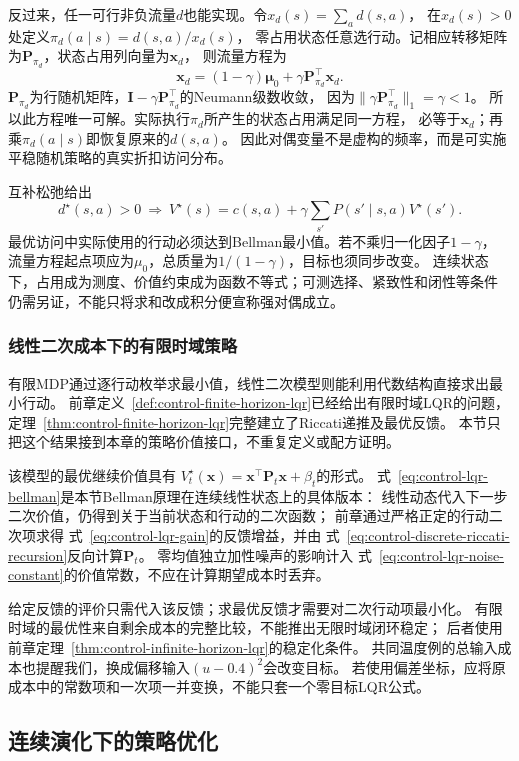 反过来，任一可行非负流量$d$也能实现。令$x_d(s)=\sum_a d(s,a)$，
在$x_d(s)>0$处定义$\pi_d(a\mid s)=d(s,a)/x_d(s)$，
零占用状态任意选行动。记相应转移矩阵为$\bm P_{\pi_d}$，状态占用列向量为$\bm x_d$，
则流量方程为
\[
  \bm x_d=(1-\gamma)\bm\mu_0+\gamma\bm P_{\pi_d}^{\top}\bm x_d.
\]
$\bm P_{\pi_d}$为行随机矩阵，$\bm I-\gamma\bm P_{\pi_d}^{\top}$的Neumann级数收敛，
因为$\lVert\gamma\bm P_{\pi_d}^{\top}\rVert_1=\gamma<1$。
所以此方程唯一可解。实际执行$\pi_d$所产生的状态占用满足同一方程，
必等于$\bm x_d$；再乘$\pi_d(a\mid s)$即恢复原来的$d(s,a)$。
因此对偶变量不是虚构的频率，而是可实施平稳随机策略的真实折扣访问分布。

互补松弛给出
\[
  d^\star(s,a)>0\ \Longrightarrow\
  V^\star(s)=c(s,a)+\gamma\sum_{s'}P(s'\mid s,a)V^\star(s').
\]
最优访问中实际使用的行动必须达到Bellman最小值。若不乘归一化因子$1-\gamma$，
流量方程起点项应为$\mu_0$，总质量为$1/(1-\gamma)$，目标也须同步改变。
连续状态下，占用成为测度、价值约束成为函数不等式；可测选择、紧致性和闭性等条件
仍需另证，不能只将求和改成积分便宣称强对偶成立。

\subsubsection{线性二次成本下的有限时域策略}

有限MDP通过逐行动枚举求最小值，线性二次模型则能利用代数结构直接求出最小行动。
前章定义~\ref{def:control-finite-horizon-lqr}已经给出有限时域LQR的问题，
定理~\ref{thm:control-finite-horizon-lqr}完整建立了Riccati递推及最优反馈。
本节只把这个结果接到本章的策略价值接口，不重复定义或配方证明。

该模型的最优继续价值具有
$V_t^\star(\bm x)=\bm x^\top\bm P_t\bm x+\beta_t$的形式。
式~\eqref{eq:control-lqr-bellman}是本节Bellman原理在连续线性状态上的具体版本：
线性动态代入下一步二次价值，仍得到关于当前状态和行动的二次函数；
前章通过严格正定的行动二次项求得
式~\eqref{eq:control-lqr-gain}的反馈增益，并由
式~\eqref{eq:control-discrete-riccati-recursion}反向计算$\bm P_t$。
零均值独立加性噪声的影响计入
式~\eqref{eq:control-lqr-noise-constant}的价值常数，不应在计算期望成本时丢弃。

给定反馈的评价只需代入该反馈；求最优反馈才需要对二次行动项最小化。
有限时域的最优性来自剩余成本的完整比较，不能推出无限时域闭环稳定；
后者使用前章定理~\ref{thm:control-infinite-horizon-lqr}的稳定化条件。
共同温度例的总输入成本也提醒我们，换成偏移输入$(u-0.4)^2$会改变目标。
若使用偏差坐标，应将原成本中的常数项和一次项一并变换，不能只套一个零目标LQR公式。

\subsection{连续演化下的策略优化}
\label{sec:control-hjb}

